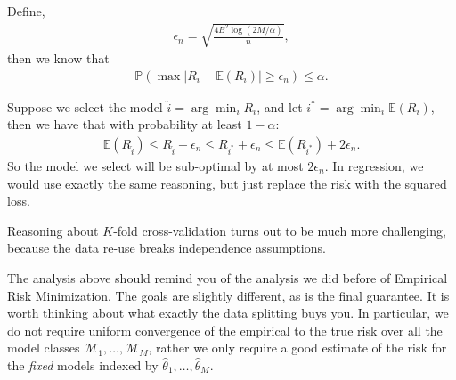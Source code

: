 \documentclass[twoside,12pt]{article}
\begin{document}
Define, 
\begin{align*}
\epsilon_n = \sqrt{ \frac{ 4B^2 \log (2M/\alpha)}{n}},
\end{align*}
then we know that 
\begin{align*}
\mathbb{P}(\max | R_i - \mathbb{E} (R_i) | \geq \epsilon_n) \leq \alpha.
\end{align*}

Suppose we select the model $\widehat{i} = \arg \min_i R_i$, 
and let $i^* = \arg \min_i \mathbb{E}(R_i)$, then we have that with probability
at least $1 - \alpha$:
\begin{align*}
\mathbb{E}(R_{\widehat{i}}) \leq R_{\widehat{i}} + \epsilon_n \leq R_{i^*} + \epsilon_n \leq
\mathbb{E}(R_{i^*}) + 2 \epsilon_n.
\end{align*}
So the model we select will be sub-optimal by at most $2\epsilon_n$. In regression, we would use exactly the same reasoning, but just replace the risk with the squared loss. 

Reasoning about $K$-fold  cross-validation turns out to be much more challenging, because  the data re-use breaks independence assumptions. 

The analysis above should remind you of the analysis we did before of Empirical Risk Minimization. The goals are slightly different, as is the final guarantee. It is worth thinking about what exactly the data splitting buys you. In particular, we do not require uniform convergence of the empirical to the true risk over all the model classes $\mathcal{M}_1,\ldots,\mathcal{M}_M$, rather we only require a good estimate of the risk for the \emph{fixed} models indexed by $\widehat{\theta}_1,\ldots,\widehat{\theta}_M$.
\end{document}
